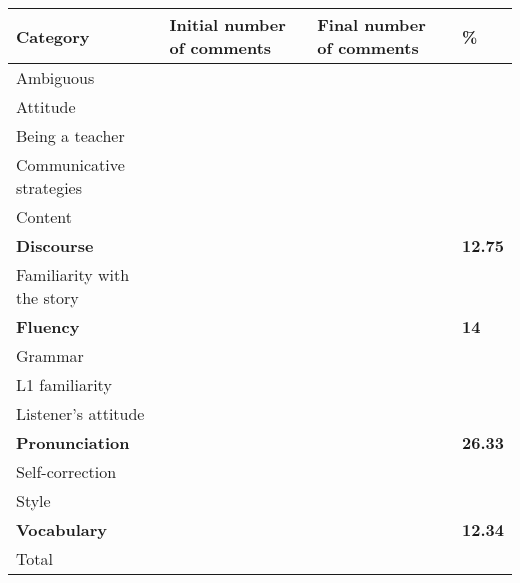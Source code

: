 \documentclass[12pt]{article}
\begin{document}
\begin{center}
\tablehead{}
\begin{supertabular}{m{1.8900598in}m{0.70875984in}m{0.6754598in}m{0.6434598in}}
\hline
\bfseries Category &
\bfseries Initial number of comments &
\bfseries Final number of comments &
\bfseries \%\\\hline
\mdseries Ambiguous &
 &
 &
\\
\mdseries Attitude &
 &
 &
\\
\mdseries Being a teacher &
 &
 &
\\
\mdseries Communicative strategies &
 &
 &
\\
\mdseries Content &
 &
 &
\\
\mdseries \textbf{Discourse} &
 &
 &
\mdseries \textbf{12.75}\\
\mdseries Familiarity with the story &
 &
 &
\\
\mdseries \textbf{Fluency} &
 &
 &
\mdseries \textbf{14}\\
\mdseries Grammar &
 &
 &
\\
\mdseries L1 familiarity &
 &
 &
\\
\mdseries Listener’s attitude &
 &
 &
\\
\mdseries \textbf{Pronunciation} &
 &
 &
\mdseries \textbf{26.33}\\
\mdseries Self-correction\ \  &
 &
 &
\\
\mdseries Style &
 &
 &
\\
\mdseries \textbf{Vocabulary} &
 &
 &
\mdseries \textbf{12.34}\\
\mdseries Total  &
 &
 &
\\\hline
\end{supertabular}
\end{center}
\end{document}
